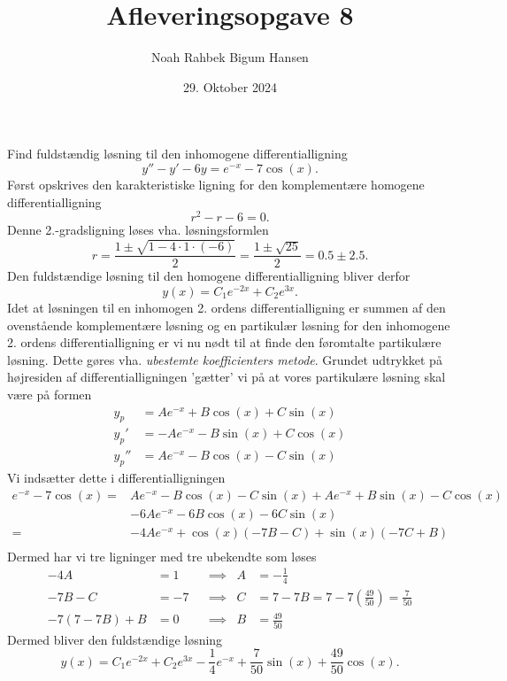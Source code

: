 \documentclass[12pt]{article}
\title{Afleveringsopgave 8}
\author{Noah Rahbek Bigum Hansen}
\date{29. Oktober 2024}
\theoremstyle{definition}
\begin{document}
\maketitle

Find fuldstændig løsning til den inhomogene differentialligning
\[
y''-y'-6y=e^{-x} -7 \cos \left( x \right) 
.\]
\bigbreak
Først opskrives den karakteristiske ligning for den komplementære homogene differentialligning
\[
r^2 - r - 6 = 0
.\]
Denne 2.-gradsligning løses vha. løsningsformlen
\[
r = \frac{1 \pm \sqrt{1-4\cdot 1\cdot (-6)}}{2} = \frac{1 \pm \sqrt{25} }{2} = \num{0,5} \pm \num{2,5}
.\]
Den fuldstændige løsning til den homogene differentialligning bliver derfor
\[
y(x) = C_1e^{-2x} + C_2e^{3x}  
.\]
Idet at løsningen til en inhomogen 2. ordens differentialligning er summen af den ovenstående komplementære løsning og en partikulær løsning for den inhomogene 2. ordens differentialligning er vi nu nødt til at finde den føromtalte partikulære løsning. Dette gøres vha. \textit{ubestemte koefficienters metode}. Grundet udtrykket på højresiden af differentialligningen 'gætter' vi på at vores partikulære løsning skal være på formen
\begin{align*}
  y_p &= Ae^{-x} + B \cos \left( x \right) + C \sin \left( x \right) \\ 
  y_p' &= -Ae^{-x} - B \sin \left( x \right) + C \cos \left( x \right)  \\
  y_p'' &= Ae^{-x} - B \cos \left( x \right) - C \sin \left( x \right) 
\end{align*}
Vi indsætter dette i differentialligningen
\begin{align*}
  e^{-x} - 7 \cos \left( x \right) =& Ae^{-x} - B \cos \left( x \right) - C \sin \left( x \right) + Ae^{-x} + B \sin \left( x \right) - C \cos \left( x \right) \\
  &-6Ae^{-x} -6B \cos \left( x \right) - 6C \sin \left( x \right) \\
  =& -4Ae^{-x} + \cos \left( x \right) \left( -7B -C \right) + \sin \left( x \right) \left( -7C + B \right)   \\
\end{align*}
Dermed har vi tre ligninger med tre ubekendte som løses
\begin{align*}
  -4A&= 1 & &\implies & A &= -\frac{1}{4} \\
  -7B-C &= -7 & &\implies & C &= 7-7B = 7-7\left( \frac{49}{50} \right) = \frac{7}{50} \\
  -7\left( 7-7B \right) + B &= 0 & &\implies & B &= \frac{49}{50}
\end{align*}
Dermed bliver den fuldstændige løsning
\[
y(x) = C_1e^{-2x} + C_2e^{3x} - \frac{1}{4}e^{-x} + \frac{7}{50} \sin \left( x \right) + \frac{49}{50} \cos \left( x \right) 
.\]
\end{document}

